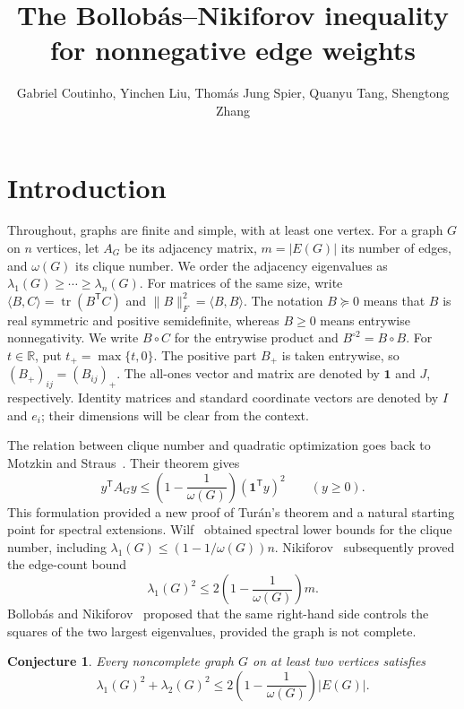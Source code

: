 \documentclass[11pt]{article}
\title{The Bollob\'as--Nikiforov inequality for nonnegative edge weights}
\author{Gabriel Coutinho, Yinchen Liu, Thom\'as Jung Spier, Quanyu Tang, Shengtong Zhang}
\date{}
\newtheorem{conjecture}[theorem]{Conjecture}
\theoremstyle{remark}
\DeclareMathOperator{\tr}{tr}
\newcommand{\R}{\mathbb R}
\newcommand{\ip}[2]{\langle #1,#2\rangle}
\newcommand{\fro}[1]{\lVert #1\rVert_F}
\begin{document}
\maketitle

\section{Introduction}

Throughout, graphs are finite and simple, with at least one vertex.
For a graph $G$ on $n$ vertices, let $A_G$ be its adjacency matrix,
$m=|E(G)|$ its number of edges, and $\omega(G)$ its clique number.
We order the adjacency eigenvalues as
$\lambda_1(G)\ge\cdots\ge\lambda_n(G)$.
For matrices of the same size, write
$\ip{B}{C}=\tr(B^{\mathsf T}C)$ and
$\fro{B}^2=\ip{B}{B}$.
The notation $B\succeq0$ means that $B$ is real symmetric and positive
semidefinite, whereas $B\ge0$ means entrywise nonnegativity.
We write $B\circ C$ for the entrywise product and $B^{\circ2}=B\circ B$.
For $t\in\R$, put $t_+=\max\{t,0\}$.
The positive part $B_+$ is taken entrywise, so $(B_+)_{ij}=(B_{ij})_+$.
The all-ones vector and matrix are denoted by $\mathbf1$ and $J$, respectively.
Identity matrices and standard coordinate vectors are denoted by $I$ and $e_i$;
their dimensions will be clear from the context.

The relation between clique number and quadratic optimization goes back to
Motzkin and Straus~\cite{MS}. Their theorem gives
\begin{equation}\label{eq:MS}
 y^{\mathsf T}A_Gy\le
 \left(1-\frac1{\omega(G)}\right)(\mathbf1^{\mathsf T}y)^2
 \qquad(y\ge0).
\end{equation}
This formulation provided a new proof of Tur\'an's theorem and a natural starting
point for spectral extensions. Wilf~\cite{Wilf} obtained spectral lower bounds
for the clique number, including
$\lambda_1(G)\le (1-1/\omega(G))n$.
Nikiforov~\cite{Nikiforov} subsequently proved the edge-count bound
\[
 \lambda_1(G)^2\le 2\left(1-\frac1{\omega(G)}\right)m.
\]
Bollob\'as and Nikiforov~\cite{BN} proposed that the same right-hand side controls
the squares of the two largest eigenvalues, provided the graph is not complete.

\begin{conjecture}\label{conj:BN}
Every noncomplete graph $G$ on at least two vertices satisfies
\[
 \lambda_1(G)^2+\lambda_2(G)^2
 \le 2\left(1-\frac1{\omega(G)}\right)|E(G)|.
\]
\end{conjecture}
\end{document}
